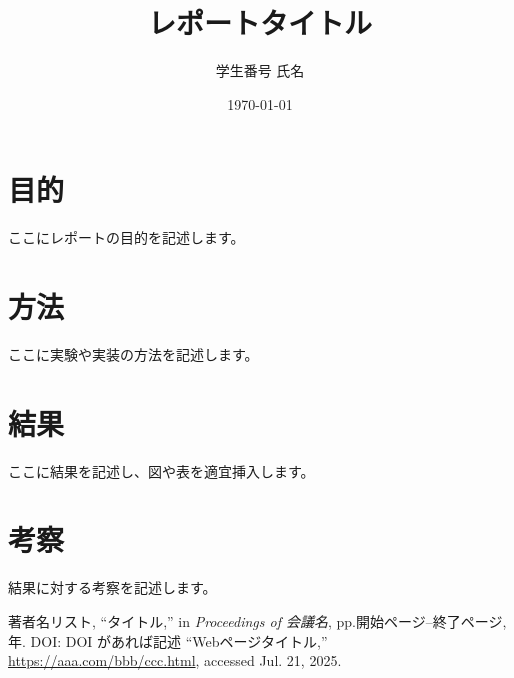 \documentclass[a4paper,11pt]{jsarticle}
\title{レポートタイトル}
\author{学生番号 氏名}
\date{\today}
\begin{document}
\maketitle

\section{目的}
ここにレポートの目的を記述します。

\section{方法}
ここに実験や実装の方法を記述します。

\section{結果}
ここに結果を記述し、図や表を適宜挿入します。

\section{考察}
結果に対する考察を記述します。

\begin{thebibliography}{9}
    著者名リスト, ``タイトル,'' in \textit{Proceedings of 会議名}, pp.開始ページ--終了ページ, 年. DOI: DOI があれば記述
    ``Webページタイトル,''
    \url{https://aaa.com/bbb/ccc.html},
    accessed Jul. 21, 2025.
\end{thebibliography}
\end{document}
